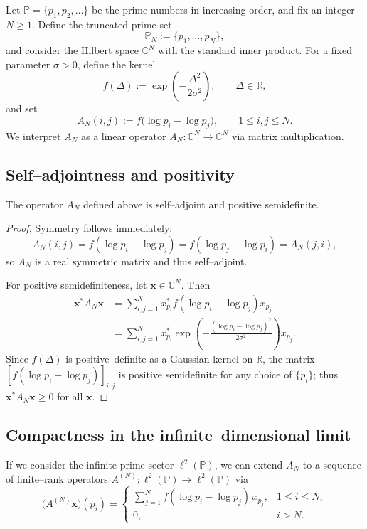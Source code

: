 \documentclass[11pt]{article}
\begin{document}
Let $\mathbb{P} = \{p_1, p_2, \dots\}$ be the prime numbers in increasing order, and fix an integer $N\geq 1$. Define the truncated prime set
\[
\mathbb{P}_N := \{p_1,\dots,p_N\},
\]
and consider the Hilbert space $\mathbb{C}^N$ with the standard inner product. For a fixed parameter $\sigma>0$, define the kernel
\begin{equation}
  f(\Delta) := \exp\left(-\frac{\Delta^2}{2\sigma^2}\right),\qquad \Delta \in \mathbb{R},
\end{equation}
and set
\begin{equation}
  A_N(i,j) := f\big(\log p_i - \log p_j\big),\qquad 1\leq i,j\leq N.
\end{equation}
We interpret $A_N$ as a linear operator $A_N:\mathbb{C}^N\to\mathbb{C}^N$ via matrix multiplication.

\subsection{Self--adjointness and positivity}

\begin{lemma}
The operator $A_N$ defined above is self--adjoint and positive semidefinite.
\end{lemma}

\begin{proof}
Symmetry follows immediately:
\[
A_N(i,j)
= f(\log p_i - \log p_j)
= f(\log p_j - \log p_i)
= A_N(j,i),
\]
so $A_N$ is a real symmetric matrix and thus self--adjoint.

For positive semidefiniteness, let $\bm{x}\in \mathbb{C}^N$. Then
\begin{align*}
\bm{x}^* A_N \bm{x}
&= \sum_{i,j=1}^N x_{p_i}^* f(\log p_i - \log p_j) x_{p_j} \\
&= \sum_{i,j=1}^N x_{p_i}^* \exp\!\left(-\frac{(\log p_i - \log p_j)^2}{2\sigma^2}\right) x_{p_j}.
\end{align*}
Since $f(\Delta)$ is positive--definite as a Gaussian kernel on $\mathbb{R}$, the matrix $[f(\log p_i - \log p_j)]_{i,j}$ is positive semidefinite for any choice of $\{p_i\}$; thus $\bm{x}^* A_N \bm{x} \geq 0$ for all $\bm{x}$.
\end{proof}

\subsection{Compactness in the infinite--dimensional limit}

If we consider the infinite prime sector $\ell^2(\mathbb{P})$, we can extend $A_N$ to a sequence of finite--rank operators $A^{(N)}:\ell^2(\mathbb{P})\to\ell^2(\mathbb{P})$ via
\[
\big(A^{(N)} \bm{x}\big)(p_i)
=
\begin{cases}
\displaystyle \sum_{j=1}^N f(\log p_i - \log p_j)\,x_{p_j}, & 1\leq i\leq N,\\[6pt]
0, & i>N.
\end{cases}
\]
\end{document}
